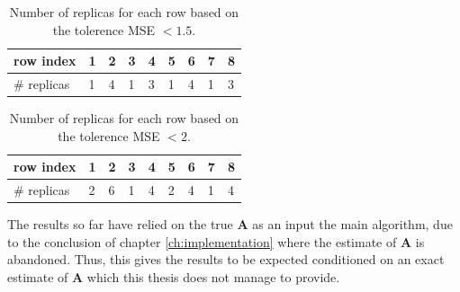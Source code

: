 \begin{table}[H]
\center
\begin{tabular}{|l|l|l|l|l|l|l|l|l|}
\hline
row index   & 1 & 2 & 3 & 4 & 5 & 6 & 7 & 8 \\ \hline
\# replicas & 1 & 4 & 1 & 3 & 1 & 4 & 1 & 3 \\ \hline
\end{tabular}
\caption{Number of replicas for each row based on the tolerence MSE $< 1.5$.}
\label{tab:replica3}
\end{table}
\noindent
\begin{table}[H]
\center
\begin{tabular}{|l|l|l|l|l|l|l|l|l|}
\hline
row index   & 1 & 2 & 3 & 4 & 5 & 6 & 7 & 8 \\ \hline
\# replicas & 2 & 6 & 1 & 4 & 2 & 4 & 1 & 4 \\ \hline
\end{tabular}
\caption{Number of replicas for each row based on the tolerence MSE $< 2$.}
\label{tab:replica4}
\end{table}
\noindent
The results so far have relied on the true $\textbf{A}$ as an input the main algorithm, due to the conclusion of chapter \ref{ch:implementation} where the estimate of $\textbf{A}$ is abandoned. Thus, this gives the results to be expected conditioned on an exact estimate of $\textbf{A}$ which this thesis does not manage to provide.

